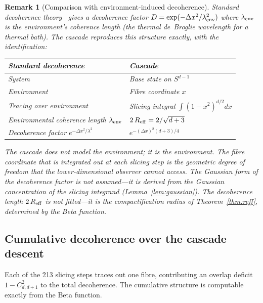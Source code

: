 \documentclass[12pt,a4paper]{article}
\newtheorem{remark}[theorem]{Remark}
\begin{document}
\begin{remark}[Comparison with environment-induced decoherence]
Standard decoherence theory~\cite{zurek} gives a decoherence factor
$D = \exp(-\Delta x^2/\lambda_{\rm env}^2)$ where $\lambda_{\rm env}$ is the environment's
coherence length (the thermal de~Broglie wavelength for a thermal bath). The cascade
reproduces this structure exactly, with the identification:
\begin{center}
\begin{tabular}{ll}
\toprule
Standard decoherence & Cascade \\
\midrule
System & Base state on $S^{d-1}$ \\
Environment & Fibre coordinate $x$ \\
Tracing over environment & Slicing integral $\int(1-x^2)^{d/2}dx$ \\
Environmental coherence length $\lambda_{\rm env}$ & $2\,R_{\rm eff} = 2/\sqrt{d+3}$ \\
Decoherence factor $e^{-\Delta x^2/\lambda^2}$ & $e^{-(\Delta x)^2(d+3)/4}$ \\
\bottomrule
\end{tabular}
\end{center}
The cascade does not model the environment; it \emph{is} the environment. The
fibre coordinate that is integrated out at each slicing step is the geometric
degree of freedom that the lower-dimensional observer cannot access. The
Gaussian form of the decoherence factor is not assumed---it is derived from
the Gaussian concentration of the slicing integrand
(Lemma~\ref{lem:gaussian}). The decoherence length $2\,R_{\rm eff}$ is not
fitted---it is the compactification radius of Theorem~\ref{thm:reff},
determined by the Beta function.
\end{remark}

\subsection{Cumulative decoherence over the cascade descent}

Each of the 213 slicing steps traces out one fibre, contributing an overlap deficit
$1-C^2_{d,d+1}$ to the total decoherence. The cumulative structure is computable exactly
from the Beta function.
\end{document}
